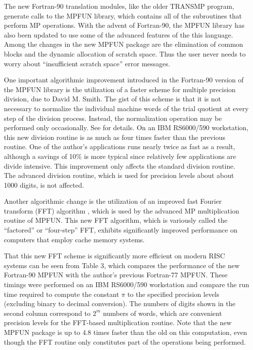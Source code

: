 The new Fortran-90 translation modules, like the older TRANSMP
program, generate calls to the MPFUN library, which contains all of
the subroutines that perform MP operations.  With the advent of
Fortran-90, the MPFUN library has also been updated to use some of the
advanced features of the this language.  Among the changes in the new
MPFUN package are the elimination of common blocks and the dynamic
allocation of scratch space.  Thus the user never needs to worry about
``insufficient scratch space'' error messages.

One important algorithmic improvement introduced in the Fortran-90
version of the MPFUN library is the utilization of a faster scheme for
multiple precision division, due to David M. Smith.  The gist of this
scheme is that it is not necessary to normalize the individual machine
words of the trial quotient at every step of the division process.
Instead, the normalization operation may be performed only
occasionally.  See \cite{smith} for details.  On an IBM RS6000/590
workstation, this new division routine is as much as four times faster
than the previous routine.  One of the author's applications runs
nearly twice as fast as a result, although a savings of 10\% is more
typical since relatively few applications are divide intensive.  This
improvement only affects the standard division routine.  The advanced
division routine, which is used for precision levels about about 1000
digits, is not affected.

Another algorithmic change is the utilization of an improved fast
Fourier transform (FFT) algorithm \cite{dhb-fftq}, which is used by
the advanced MP multiplication routine of MPFUN.  This new FFT
algorithm, which is variously called the ``factored'' or ``four-step''
FFT, exhibits significantly improved performance on computers that
employ cache memory systems.

That this new FFT scheme is significantly more efficient on modern
RISC systems can be seen from Table 3, which compares the performance
of the new Fortran-90 MPFUN with the author's previous Fortran-77
MPFUN.  These timings were performed on an IBM RS6000/590 workstation
and compare the run time required to compute the constant $\pi$ to the
specified precision levels (excluding binary to decimal conversion).
The numbers of digits shown in the second column correspond to $2^m$
numbers of words, which are convenient precision levels for the
FFT-based multiplication routine.  Note that the new MPFUN package is
up to 4.8 times faster than the old on this computation, even though
the FFT routine only constitutes part of the operations being
performed.


